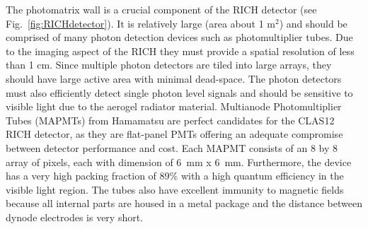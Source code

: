 The photomatrix  wall is a crucial component of the RICH detector (see Fig.~\ref{fig:RICHdetector}). It is relatively large (area about 1 m$^2$) and should be comprised of many photon detection devices such as photomultiplier tubes.
Due to the imaging aspect of the RICH they must provide a spatial resolution of less than 1 cm.
Since multiple photon detectors are tiled into large arrays, they should have large active area with minimal dead-space.
The photon detectors must also efficiently detect single photon level signals and should be sensitive to visible light due to the aerogel radiator material.
Multianode Photomultiplier Tubes (MAPMTs) from Hamamatsu are perfect candidates for the CLAS12 RICH detector, as they are flat-panel PMTs offering an adequate compromise between detector performance and cost.
Each MAPMT consists of an 8 by 8 array of pixels, each with dimension of 6~mm x 6~mm.
Furthermore, the device has a very high packing fraction of 89\% with a high quantum efficiency in the visible light region.
The tubes also have excellent immunity to magnetic fields because all internal parts are housed in a metal package and the distance between dynode electrodes is very short.


